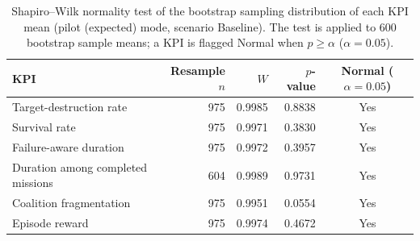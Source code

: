 \begin{table}[htbp]
  \centering
  \caption{Shapiro--Wilk normality test of the bootstrap sampling distribution of each KPI mean (pilot (expected) mode, scenario Baseline). The test is applied to 600 bootstrap sample means; a KPI is flagged Normal when $p \geq \alpha$ ($\alpha=0.05$).}
  \label{tab:normality_Baseline_pilot}
  \begin{tabular}{lrrrc}
    \toprule
    KPI & Resample $n$ & $W$ & $p$-value & Normal ($\alpha=0.05$) \\
    \midrule
    Target-destruction rate & 975 & 0.9985 & 0.8838 & Yes \\
    Survival rate & 975 & 0.9971 & 0.3830 & Yes \\
    Failure-aware duration & 975 & 0.9972 & 0.3957 & Yes \\
    Duration among completed missions & 604 & 0.9989 & 0.9731 & Yes \\
    Coalition fragmentation & 975 & 0.9951 & 0.0554 & Yes \\
    Episode reward & 975 & 0.9974 & 0.4672 & Yes \\
    \bottomrule
  \end{tabular}
\end{table}
